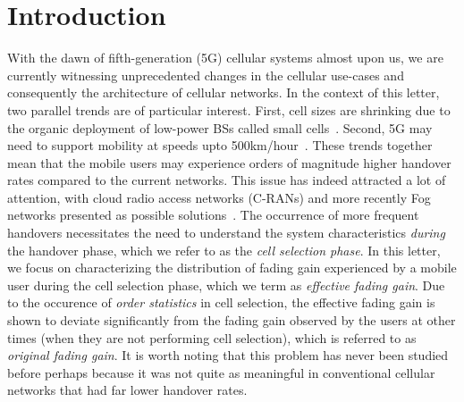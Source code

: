 \documentclass[final]{IEEEtran}
\begin{document}
\section{Introduction} \label{sec:intro}
With the dawn of fifth-generation (5G) cellular systems almost upon us, we are currently witnessing unprecedented changes in the cellular use-cases and consequently the architecture of cellular networks. In the context of this letter, two parallel trends are of particular interest. First, cell sizes are shrinking due to the organic deployment of low-power BSs called small cells~\cite{DhiGanJ2012}. Second, 5G may need to support mobility at speeds upto 500km/hour~\cite{ITUM2015}. These trends together mean that the mobile users may experience orders of magnitude higher handover rates compared to the current networks. This issue has indeed attracted a lot of attention, with cloud radio access networks (C-RANs) and more recently Fog networks presented as possible solutions~\cite{CheChrJ2015}. The occurrence of more frequent handovers necessitates the need to understand the system characteristics {\em during} the handover phase, which we refer to as the {\em cell selection phase}. In this letter, we focus on characterizing the distribution of fading gain experienced by a mobile user during the cell selection phase, which we term as {\em effective fading gain}. Due to the occurence of {\em order statistics} in cell selection, the effective fading gain is shown to deviate significantly from the fading gain observed by the users at other times (when they are not performing cell selection), which is referred to as {\em original fading gain}. It is worth noting that this problem has never been studied before perhaps because it was not quite as meaningful in conventional cellular networks that had far lower handover rates. 



\end{document}
